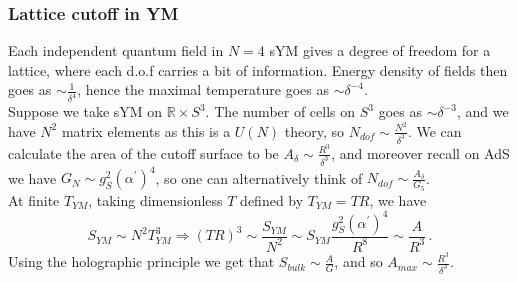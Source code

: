 \documentclass{article}
\begin{document}
\subsubsection{Lattice cutoff in YM}
Each independent quantum field in $N=4$ sYM gives a degree of freedom for a lattice, where each d.o.f carries a bit of information. Energy density of fields then goes as $\sim \frac{1}{\delta^4}$, hence the maximal temperature goes as $\sim \delta^{-4}$. \\
Suppose we take sYM on $\mathbb{R}\times S^3$. The number of cells on $S^3$ goes as $\sim \delta^{-3}$, and we have $N^2$ matrix elements as this is a $U(N)$ theory, so $N_{dof} \sim \frac{N^2}{\delta^3}$. We can calculate the area of the cutoff surface to be $A_\delta \sim \frac{R^3}{\delta^3}$, and moreover recall on AdS we have $G_N \sim g_S^2 (\alpha^\prime)^4$, so one can alternatively think of $N_{dof} \sim \frac{A_\delta}{G_5}$. \\
At finite $T_{YM}$, taking dimensionless $T$ defined by $T_{YM} = TR$,  we have 
\[
S_{YM} \sim N^2 T_{YM}^3 \Rightarrow (TR)^3 \sim \frac{S_{YM}}{N^2} \sim S_{YM} \frac{g_S^2 (\alpha^\prime)^4}{R^8} \sim \frac{A}{R^3} \, .
\]
Using the holographic principle we get that $S_{bulk} \sim \frac{A}{G}$, and so $A_{max} \sim \frac{R^3}{\delta^3}$. 

\end{document}
